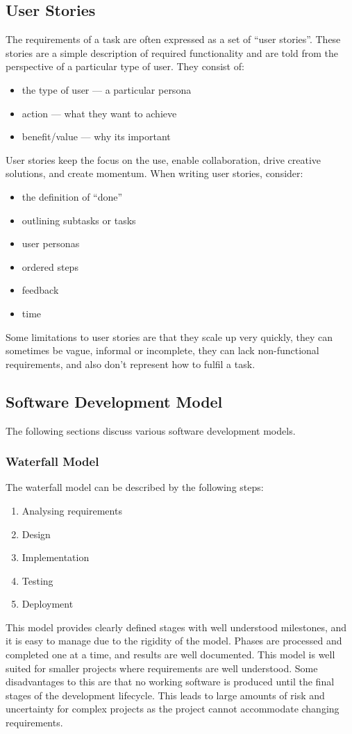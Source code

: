 \documentclass{article}
\begin{document}
\subsection{User Stories}
The requirements of a task are often expressed as a set of ``user
stories''. These stories are a simple description of required
functionality and are told from the perspective of a particular type of
user. They consist of:
\begin{itemize}
    \item the type of user --- a particular persona
    \item action --- what they want to achieve
    \item benefit/value --- why its important
\end{itemize}
User stories keep the focus on the use, enable collaboration, drive
creative solutions, and create momentum. When writing user stories,
consider:
\begin{itemize}
    \item the definition of ``done''
    \item outlining subtasks or tasks
    \item user personas
    \item ordered steps
    \item feedback
    \item time
\end{itemize}
Some limitations to user stories are that they scale up very quickly, they can sometimes
be vague, informal or incomplete, they can lack non-functional requirements, and also don't
represent how to fulfil a task.
\subsection{Software Development Model}
The following sections discuss various software development models.
\subsubsection{Waterfall Model}
The waterfall model can be described by the following steps:
\begin{enumerate}
    \item Analysing requirements
    \item Design
    \item Implementation
    \item Testing
    \item Deployment
\end{enumerate}
This model provides clearly defined stages with well understood milestones, and
it is easy to manage due to the rigidity of the model.
Phases are processed and completed one at a time, and results are well documented.
This model is well suited for smaller projects where requirements are well understood.
Some disadvantages to this are that no working software is produced
until the final stages of the development lifecycle. This leads to
large amounts of risk and uncertainty for complex projects as the
project cannot accommodate changing requirements.
\end{document}
